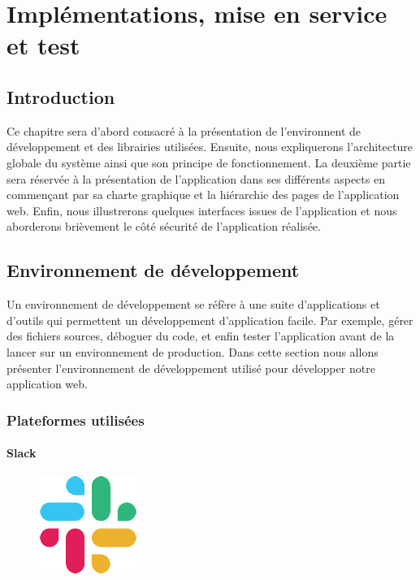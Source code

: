 \chapter{Implémentations, mise en service et test}
\renewcommand{\headrulewidth}{1pt}

\section{Introduction}
Ce chapitre sera d'abord consacré à la présentation de l’environnent de
développement et des librairies utilisées. Ensuite, nous expliquerons
l’architecture globale du système ainsi que son principe de fonctionnement. La
deuxième partie sera réservée à la présentation de l’application dans ses
différents aspects en commençant par sa charte graphique et la hiérarchie des
pages de l’application web. Enfin, nous illustrerons quelques interfaces issues
de l’application et nous aborderons brièvement le côté sécurité de l’application
réalisée.   

\section{Environnement de développement}
Un environnement de développement se réfère à une suite d’applications et 
d’outils qui permettent un développement d’application facile. Par exemple, 
gérer des fichiers sources, déboguer du code, et enfin tester l’application 
avant de la lancer sur un environnement de production. Dans cette 
section nous allons présenter l’environnement de développement utilisé pour 
développer notre application web.

\subsection{Plateformes utilisées}

\subsubsection*{Slack}
\begin{figure}
    \vspace{-22pt}
    \begin{center}
        \includegraphics[scale=0.36]{images/logo/slack.png}
        \label{fig62}
    \end{center}
    \vspace{-20pt}
    \vspace{-10pt}
\end{figure}

